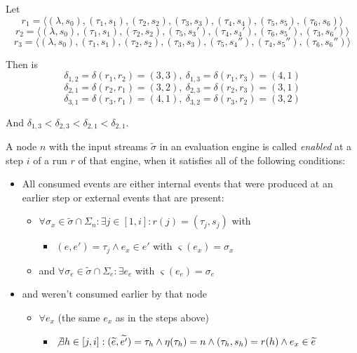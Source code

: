 \begin{exmp}
  Let
  \[r_1 = \langle (\lambda, s_0), (\tau_1,s_1), (\tau_2,s_2), (\tau_3,s_3), (\tau_4,s_4), (\tau_5,s_5), (\tau_6,s_6) \rangle\]
  \[r_2 = \langle (\lambda, s_0), (\tau_1,s_1), (\tau_2,s_2), (\tau_5,s_3'), (\tau_4,s_4'), (\tau_6,s_5'), (\tau_3,s_6') \rangle\]
  \[r_3 = \langle (\lambda, s_0), (\tau_1,s_1), (\tau_2,s_2), (\tau_3,s_3), (\tau_5,s_4''), (\tau_4,s_5''), (\tau_6,s_6'') \rangle\]

  Then is
  \[\delta_{1,2} = \delta(r_1,r_2) = (3,3),\ \delta_{1,3} = \delta(r_1,r_3) = (4,1)\]
  \[\delta_{2,1} = \delta(r_2,r_1) = (3,2),\ \delta_{2,3} = \delta(r_2,r_3) = (3,1)\]
  \[\delta_{3,1} = \delta(r_3,r_1) = (4,1),\ \delta_{3,2} = \delta(r_3,r_2) = (3,2)\]

  And \(\delta_{1,3} < \delta_{2,3} < \delta_{2,1} < \delta_{2,1}\).


\end{exmp}

\begin{definition}[name = Enabledness of a Node]\label{def:node_enabled}
  A node \(n\) with the input streams \(\widetilde{\sigma}\) in an evaluation engine is called \emph{enabled} at a step \(i\) of a run \(r\) of that engine, when it satisfies all of the following conditions:

  \begin{itemize}
    \item All consumed events are either internal events that were produced at an earlier step or external events that are present:
      \begin{itemize}
        \item \(\forall \sigma_x \in \widetilde{\sigma} \cap \Sigma_n: \exists j \in [1, i]: r(j) = (\tau_j, s_j)\) with
          \begin{itemize}
            \item\( (e, e') = \tau_j \land e_x \in e'\) with \(\varsigma(e_x) = \sigma_x \)
          \end{itemize}
        \item and \(\forall \sigma_e \in \widetilde{\sigma} \cap\Sigma_e:\exists e_e\) with \(\varsigma(e_e) = \sigma_e\)
      \end{itemize}
    \item and weren't consumed earlier by that node
      \begin{itemize}
        \item \(\forall e_x\) (the same \(e_x\) as in the steps above)
          \begin{itemize}
            \item \(\not\exists h \in [j, i]: (\widetilde{e}, \widetilde{e'}) = \tau_h \land \eta(\tau_h) = n \land (\tau_h, s_h) = r(h) \land e_x \in \widetilde{e}\)
          \end{itemize}
      \end{itemize}
  \end{itemize}
\end{definition}

